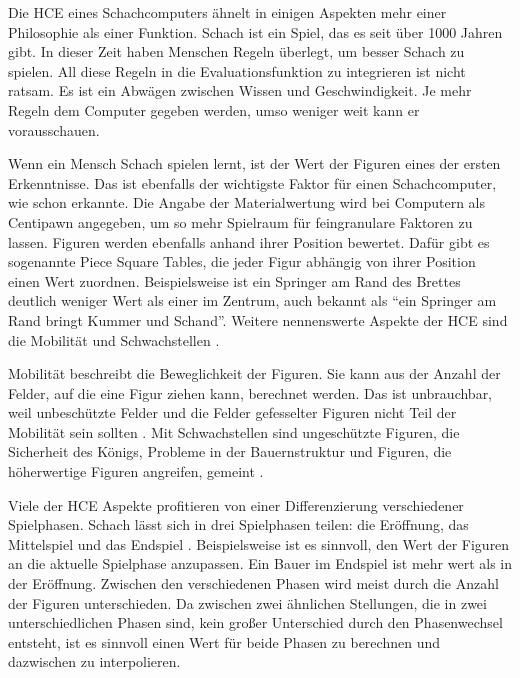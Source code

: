 Die \ac{HCE} eines Schachcomputers ähnelt in einigen Aspekten mehr einer Philosophie als einer Funktion. Schach ist ein Spiel, das es seit über 1000 Jahren gibt. In dieser Zeit haben Menschen Regeln überlegt, um besser Schach zu spielen. All diese Regeln in die Evaluationsfunktion zu integrieren ist nicht ratsam. Es ist ein Abwägen zwischen Wissen und Geschwindigkeit. Je mehr Regeln dem Computer gegeben werden, umso weniger weit kann er vorausschauen.

Wenn ein Mensch Schach spielen lernt, ist der Wert der Figuren eines der ersten Erkenntnisse. Das ist ebenfalls der wichtigste Faktor für einen Schachcomputer, wie schon \citeauthor{Shannon1950} \citeyear{Shannon1950} \cite{Shannon1950} erkannte. Die Angabe der Materialwertung wird bei Computern als Centipawn angegeben, um so mehr Spielraum für feingranulare Faktoren zu lassen. Figuren werden ebenfalls anhand ihrer Position bewertet. Dafür gibt es sogenannte Piece Square Tables, die jeder Figur abhängig von ihrer Position einen Wert zuordnen. Beispielsweise ist ein Springer am Rand des Brettes deutlich weniger Wert als einer im Zentrum, auch bekannt als \enquote{ein Springer am Rand bringt Kummer und Schand}. Weitere nennenswerte Aspekte der \ac{HCE} sind die Mobilität und Schwachstellen \cite[S. 228]{Levy1988}.

Mobilität beschreibt die Beweglichkeit der Figuren. Sie kann aus der Anzahl der Felder, auf die eine Figur ziehen kann, berechnet werden. Das ist unbrauchbar, weil unbeschützte Felder und die Felder gefesselter Figuren nicht Teil der Mobilität sein sollten \cite[S. 228]{Levy1988}. Mit Schwachstellen sind ungeschützte Figuren, die Sicherheit des Königs, Probleme in der Bauernstruktur und Figuren, die höherwertige Figuren angreifen, gemeint \cite[S. 228]{Levy1988}.

Viele der \ac{HCE} Aspekte profitieren von einer Differenzierung verschiedener Spielphasen. Schach lässt sich in drei Spielphasen teilen: die Eröffnung, das Mittelspiel und das Endspiel \cite[S. 8]{Levy1988}. Beispielsweise ist es sinnvoll, den Wert der Figuren an die aktuelle Spielphase anzupassen. Ein Bauer im Endspiel ist mehr wert als in der Eröffnung. Zwischen den verschiedenen Phasen wird meist durch die Anzahl der Figuren unterschieden. Da zwischen zwei ähnlichen Stellungen, die in zwei unterschiedlichen Phasen sind, kein großer Unterschied durch den Phasenwechsel entsteht, ist es sinnvoll einen Wert für beide Phasen zu berechnen und dazwischen zu interpolieren.

